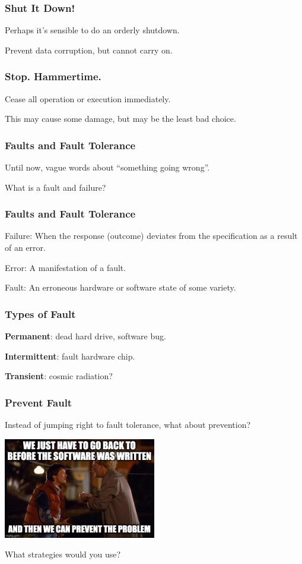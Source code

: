 \begin{frame}
\frametitle{Shut It Down!}

Perhaps it's sensible to do an orderly shutdown.

Prevent data corruption, but cannot carry on.

\end{frame}

\begin{frame}
\frametitle{Stop. Hammertime.}

Cease all operation or execution immediately.

This may cause some damage, but may be the least bad choice.

\end{frame}

\begin{frame}
\frametitle{Faults and Fault Tolerance}

Until now, vague words about ``something going wrong''.

What is a fault and failure?

\end{frame}

\begin{frame}
\frametitle{Faults and Fault Tolerance}

\alert{Failure}: When the response (outcome) deviates from the specification as a result of an error.

\alert{Error}: A manifestation of a fault.

\alert{Fault}: An erroneous hardware or software state of some variety.

\end{frame}

\begin{frame}
\frametitle{Types of Fault}

\textbf{Permanent}: dead hard drive, software bug.

\textbf{Intermittent}: fault hardware chip.

\textbf{Transient}: cosmic radiation?

\end{frame}

\begin{frame}
\frametitle{Prevent Fault}

Instead of jumping right to fault tolerance, what about prevention?

\begin{center}
	\includegraphics[width=0.5\textwidth]{images/bttf2.jpg}
\end{center}

What strategies would you use?

\end{frame}


